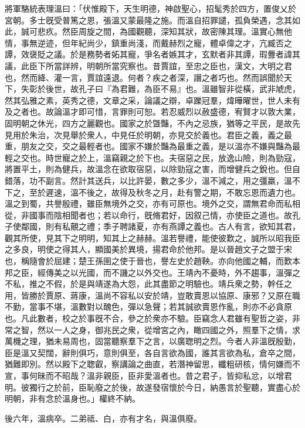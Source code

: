 \begin{pinyinscope}
 
 
 
 將軍駱統表理溫曰：「伏惟殿下，天生明德，神啟聖心，招髦秀於四方，置俊乂於宮朝。多士旣受普篤之恩，張溫又蒙最隆之施。而溫自招罪譴，孤負榮遇，念其如此，誠可悲疚。然臣周旋之間，為國觀聽，深知其狀，故密陳其理。溫實心無他情，事無逆迹，但年紀尚少，鎮重尚淺，而戴赫烈之寵，體卓偉之才，亢臧否之譚，效襃貶之議。於是務勢者妬其寵，爭名者嫉其才，玄默者非其譚，瑕釁者諱其議，此臣下所當詳辨，明朝所當究察也。昔賈誼，至忠之臣也，漢文，大明之君也，然而絳、灌一言，賈誼遠退。何者？疾之者深，譖之者巧也。然而誤聞於天下，失彰於後世，故孔子曰『為君難，為臣不易』也。溫雖智非從橫，武非虓虎，然其弘雅之素，英秀之德，文章之采，論議之辯，卓躒冠羣，煒曄曜世，世人未有及之者也。故論溫才即可惜，言罪則可恕。若忍威烈以赦盛德，宥賢才以敦大業，固明朝之休光，四方之麗觀也。國家之於曁豔，不內之忌族，猶等之平民，是故先見用於朱治，次見舉於衆人，中見任於明朝，亦見交於義也。君臣之義，義之最重，朋友之交，交之最輕者也。國家不嫌於豔為最重之義，是以溫亦不嫌與豔為最輕之交也。時世寵之於上，溫竊親之於下也。夫宿惡之民，放逸山險，則為勁寇，將置平土，則為健兵，故溫念在欲取宿惡，以除勁寇之害，而增健兵之銳也。但自錯落，功不副言。然計其送兵，以比許晏，數之多少，溫不減之，用之彊羸，溫不下之，至於遲速，溫不後之，故得及秋冬之月，赴有警之期，不敢忘恩而遺力也。溫之到蜀，共譽殷禮，雖臣無境外之交，亦有可原也。境外之交，謂無君命而私相從，非國事而陰相聞者也；若以命行，旣脩君好，因叙己情，亦使臣之道也。故孔子使鄰國，則有私覿之禮；季子聘諸夏，亦有燕譚之義也。古人有言，欲知其君，觀其所使，見其下之明明，知其上之赫赫。溫若譽禮，能使彼歎之，誠所以昭我臣之多良，明使之得其人，顯國美於異境，揚君命於他邦。是以晉趙文子之盟于宋也，稱隨會於屈建；楚王孫圉之使于晉也，譽左史於趙鞅。亦向他國之輔，而歎本邦之臣，經傳美之以光國，而不譏之以外交也。王靖內不憂時，外不趨事，溫彈之不私，推之不假，於是與靖遂為大怨，此其盡節之明驗也。靖兵衆之勢，幹任之用，皆勝於賈原、蔣康，溫尚不容私以安於靖，豈敢賣恩以協原、康邪？又原在職不勤，當事不堪，溫數對以醜色，彈以急聲；若其誠欲賣恩作亂，則亦不必貪原也。凡此數者，校之於事旣不合，參之於衆亦不驗。臣竊念人君雖有聖哲之姿，非常之智，然以一人之身，御兆民之衆，從增宮之內，瞰四國之外，照羣下之情，求萬機之理，猶未易周也，固當聽察羣下之言，以廣聦明之烈。今者人非溫旣殷勤，臣是溫又契闊，辭則俱巧，意則俱至，各自言欲為國，誰其言欲為私，倉卒之間，猶難即別。然以殿下之聦叡，察講論之曲直，若潛神留思，纖粗研核，情何嫌而不宣，事何昧而不昭哉？溫非親臣，臣非愛溫者也。昔之君子，皆抑私忿，以增君明。彼獨行之於前，臣恥廢之於後，故遂發宿懷於今日，納愚言於聖聽，實盡心於明朝，非有念於溫身也。」權終不納。
 
 
後六年，溫病卒。二弟祗、白，亦有才名，與溫俱廢。
 
 
\end{pinyinscope}